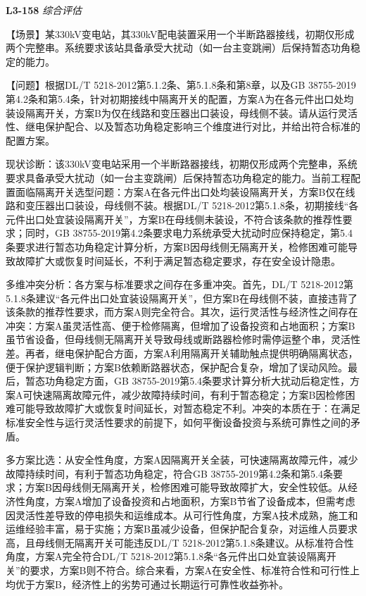 \documentclass[12pt,a4paper]{ctexart}
\begin{document}
\noindent\textbf{L3-158} \hfill \textit{综合评估}
\begin{description}[leftmargin=1.5em,style=nextline,font=\normalfont]
  \item[Q:] 【场景】某330kV变电站，其330kV配电装置采用一个半断路器接线，初期仅形成两个完整串。系统要求该站具备承受大扰动（如一台主变跳闸）后保持暂态功角稳定的能力。

【问题】根据DL/T 5218-2012第5.1.2条、第5.1.8条和第8章，以及GB 38755-2019第4.2条和第5.4条，针对初期接线中隔离开关的配置，方案A为在各元件出口处均装设隔离开关，方案B为仅在线路和变压器出口装设，母线侧不装。请从运行灵活性、继电保护配合、以及暂态功角稳定影响三个维度进行对比，并给出符合标准的配置方案。
  \item[A:] 现状诊断：该330kV变电站采用一个半断路器接线，初期仅形成两个完整串，系统要求具备承受大扰动（如一台主变跳闸）后保持暂态功角稳定的能力。当前工程配置面临隔离开关选型问题：方案A在各元件出口处均装设隔离开关，方案B仅在线路和变压器出口装设，母线侧不装。根据DL/T 5218-2012第5.1.8条，初期接线“各元件出口处宜装设隔离开关”，方案B在母线侧未装设，不符合该条款的推荐性要求；同时，GB 38755-2019第4.2条要求电力系统承受大扰动时应保持稳定，第5.4条要求进行暂态功角稳定计算分析，方案B因母线侧无隔离开关，检修困难可能导致故障扩大或恢复时间延长，不利于满足暂态稳定要求，存在安全设计隐患。

多维冲突分析：各方案与标准要求之间存在多重冲突。首先，DL/T 5218-2012第5.1.8条建议“各元件出口处宜装设隔离开关”，但方案B在母线侧不装，直接违背了该条款的推荐性要求，而方案A则完全符合。其次，运行灵活性与经济性之间存在冲突：方案A虽灵活性高、便于检修隔离，但增加了设备投资和占地面积；方案B虽节省设备，但母线侧无隔离开关导致母线或断路器检修时需停运整个串，灵活性差。再者，继电保护配合方面，方案A利用隔离开关辅助触点提供明确隔离状态，便于保护逻辑判断；方案B依赖断路器状态，保护配合复杂，增加了误动风险。最后，暂态功角稳定方面，GB 38755-2019第5.4条要求计算分析大扰动后稳定性，方案A可快速隔离故障元件，减少故障持续时间，有利于暂态稳定；方案B因检修困难可能导致故障扩大或恢复时间延长，对暂态稳定不利。冲突的本质在于：在满足标准安全性与运行灵活性要求的前提下，如何平衡设备投资与系统可靠性之间的矛盾。

多方案比选：从安全性角度，方案A因隔离开关全装，可快速隔离故障元件，减少故障持续时间，有利于暂态功角稳定，符合GB 38755-2019第4.2条和第5.4条要求；方案B因母线侧无隔离开关，检修困难可能导致故障扩大，安全性较低。从经济性角度，方案A增加了设备投资和占地面积，方案B节省了设备成本，但需考虑因灵活性差导致的停电损失和运维成本。从可行性角度，方案A技术成熟，施工和运维经验丰富，易于实施；方案B虽减少设备，但保护配合复杂，对运维人员要求高，且母线侧无隔离开关可能违反DL/T 5218-2012第5.1.8条建议。从标准符合性角度，方案A完全符合DL/T 5218-2012第5.1.8条“各元件出口处宜装设隔离开关”的要求，方案B则不符合。综合来看，方案A在安全性、标准符合性和可行性上均优于方案B，经济性上的劣势可通过长期运行可靠性收益弥补。


\end{description}
\end{document}
